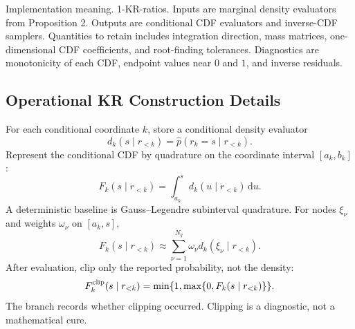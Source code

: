 \documentclass[11pt]{article}
\numberwithin{equation}{section}
\newcommand{\dd}{\,\mathrm d}
\begin{document}
Implementation meaning. 1-KR-ratios.  Inputs are marginal density
evaluators from Proposition 2.  Outputs are conditional CDF evaluators and
inverse-CDF samplers.  Quantities to retain includes integration direction, mass
matrices, one-dimensional CDF coefficients, and root-finding tolerances.
Diagnostics are monotonicity of each CDF, endpoint values near \(0\) and \(1\),
and inverse residuals.

\subsection*{Operational KR Construction Details}

For each conditional coordinate \(k\), store a conditional density evaluator
\begin{equation}
    d_k(s\mid r_{<k})
    =
    \widehat p(r_k=s\mid r_{<k}).
    \label{eq:p24-p23-krops1}
\end{equation}
Represent the conditional CDF by quadrature on the coordinate interval
\([a_k,b_k]\):
\begin{equation}
    F_k(s\mid r_{<k})
    =
    \int_{a_k}^{s}d_k(u\mid r_{<k})\dd u.
    \label{eq:p24-p23-krops2}
\end{equation}
A deterministic baseline is Gauss--Legendre subinterval quadrature.  For nodes
\(\xi_\nu\) and weights \(\omega_\nu\) on \([a_k,s]\),
\begin{equation}
    F_k(s\mid r_{<k})
    \approx
    \sum_{\nu=1}^{N_q}\omega_\nu d_k(\xi_\nu\mid r_{<k}).
    \label{eq:p24-p23-krops3}
\end{equation}
After evaluation, clip only the reported probability, not the density:
\begin{equation}
    F_k^{\rm clip}(s\mid r_{<k})
    =
    \min\{1,\max\{0,F_k(s\mid r_{<k})\}\}.
    \label{eq:p24-p23-krops4}
\end{equation}
The branch records whether clipping occurred.  Clipping is a diagnostic, not a
mathematical cure.
\end{document}

